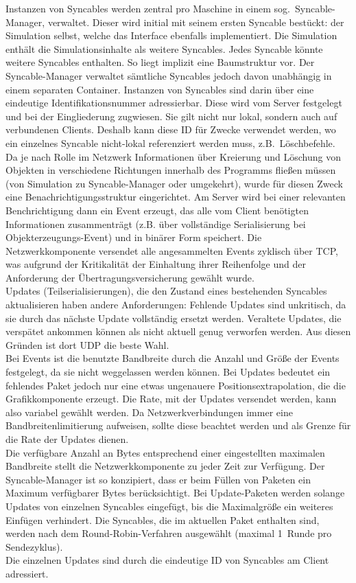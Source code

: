 Instanzen von Syncables werden zentral pro Maschine in einem sog.~Syncable-Manager, verwaltet. 
Dieser wird initial mit seinem ersten Syncable bestückt: der Simulation selbst, welche das Interface ebenfalls implementiert. Die Simulation enthält die Simulationsinhalte als weitere Syncables. Jedes Syncable könnte weitere Syncables enthalten. So liegt implizit eine Baumstruktur vor. Der Syncable-Manager verwaltet sämtliche Syncables jedoch davon unabhängig in einem separaten Container. Instanzen von Syncables sind darin über eine eindeutige Identifikationsnummer adressierbar. Diese wird vom Server festgelegt und bei der Eingliederung zugwiesen. Sie gilt nicht nur lokal, sondern auch auf verbundenen Clients. Deshalb kann diese ID für Zwecke verwendet werden, wo ein einzelnes Syncable nicht-lokal referenziert werden muss, z.B.~Löschbefehle.\\
Da je nach Rolle im Netzwerk Informationen über Kreierung und Löschung von Objekten in verschiedene Richtungen innerhalb des Programms fließen müssen (von Simulation zu Syncable-Manager oder umgekehrt), wurde für diesen Zweck eine Benachrichtigungsstruktur eingerichtet. Am Server wird bei einer relevanten Benchrichtigung dann ein Event erzeugt, das alle vom Client benötigten Informationen zusammenträgt (z.B. über vollständige Serialisierung bei Objekterzeugungs-Event) und in binärer Form speichert. Die Netzwerkkomponente versendet alle angesammelten Events zyklisch über TCP, was aufgrund der Kritikalität der Einhaltung ihrer Reihenfolge und der Anforderung der Übertragungsversicherung gewählt wurde.\\
Updates (Teilserialisierungen), die den Zustand eines bestehenden Syncables aktualisieren haben andere Anforderungen: Fehlende Updates sind unkritisch, da sie durch das nächste Update vollständig ersetzt werden. Veraltete Updates, die verspätet ankommen können als nicht aktuell genug verworfen werden. Aus diesen Gründen ist dort UDP die beste Wahl.\\
Bei Events ist die benutzte Bandbreite durch die Anzahl und Größe der Events festgelegt, da sie nicht weggelassen werden können. Bei Updates bedeutet ein fehlendes Paket jedoch nur eine etwas ungenauere Positionsextrapolation, die die Grafikkomponente erzeugt. Die Rate, mit der Updates versendet werden, kann also variabel gewählt werden. Da Netzwerkverbindungen immer eine Bandbreitenlimitierung aufweisen, sollte diese beachtet werden und als Grenze für die Rate der Updates dienen.\\
Die verfügbare Anzahl an Bytes entsprechend einer eingestellten maximalen Bandbreite stellt die Netzwerkkomponente zu jeder Zeit zur Verfügung.
Der Syncable-Manager ist so konzipiert, dass er beim Füllen von Paketen ein Maximum verfügbarer Bytes berücksichtigt.
Bei Update-Paketen werden solange Updates von einzelnen Syncables eingefügt, bis die Maximalgröße ein weiteres Einfügen verhindert. Die Syncables, die im aktuellen Paket enthalten sind, werden nach dem Round-Robin-Verfahren ausgewählt (maximal 1~Runde pro Sendezyklus).\\
Die einzelnen Updates sind durch die eindeutige ID von Syncables am Client adressiert.


